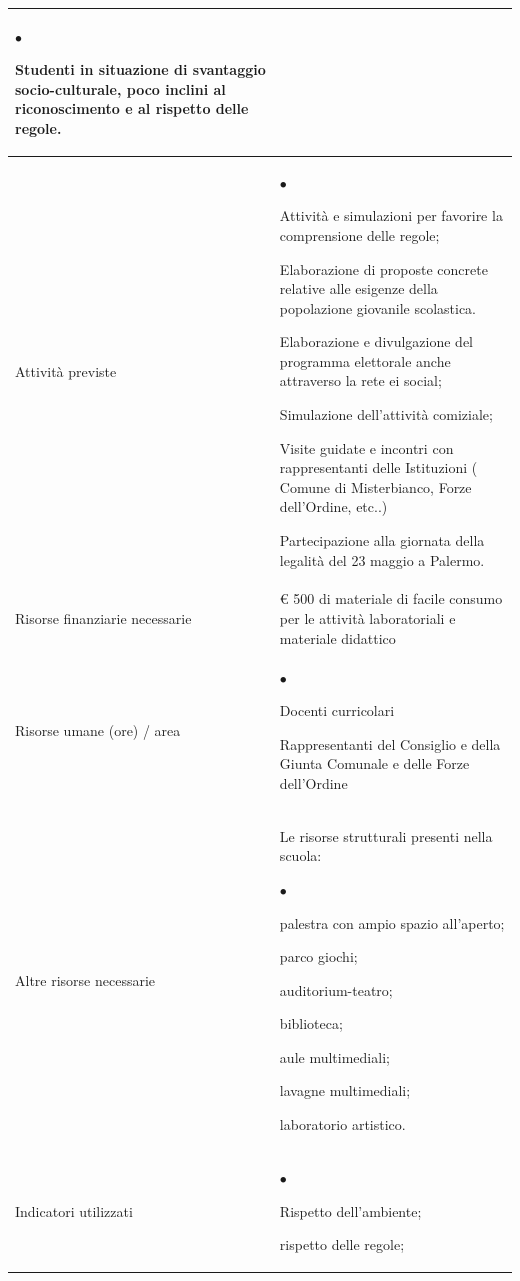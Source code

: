 \documentclass[12pt,a4paper,oneside]{memoir}
\newenvironment{elenco}{\begin{list}{$\bullet$}{%
              \setlength{\leftmargin}{4mm}%
              \setlength{\rightmargin}{1mm}%
               \setlength{\itemindent}{0mm}%
               \setlength{\labelwidth}{2mm}%
               \setlength{\labelsep}{2mm}%
              \setlength{\itemsep}{-\parsep}%
              \setlength{\partopsep}{0pt}%
              \setlength{\topsep}{0pt}%
             \setlength{\parskip}{0pt}%
              }}{\end{list}}
\begin{document}
\begin{footnotesize}
\begin{longtable}{|>{\raggedright}p{2.5cm}|>{\raggedright\arraybackslash}P{10cm}|}
\begin{elenco}
\item Studenti in situazione di svantaggio socio-culturale, poco inclini al riconoscimento e al rispetto delle regole.\end{elenco}\\ \hline
Attività previste&
\begin{elenco}
\item Attività e simulazioni per favorire la comprensione delle regole; 
\item Elaborazione di proposte concrete relative alle esigenze della popolazione giovanile scolastica.
\item Elaborazione e divulgazione del programma elettorale anche attraverso la rete ei social;
\item Simulazione dell'attività comiziale;
\item Visite guidate e incontri con rappresentanti delle Istituzioni ( Comune di Misterbianco, Forze dell'Ordine, etc..)
\item Partecipazione alla giornata della legalità del 23 maggio a Palermo.
\end{elenco}\\[-4mm] \hline
Risorse finanziarie necessarie&€ 500 di materiale di facile consumo per le attività laboratoriali e materiale didattico \\ \hline
Risorse umane (ore) / area&
\begin{elenco}
\item Docenti curricolari
\item Rappresentanti del Consiglio e della Giunta Comunale e delle Forze dell'Ordine
\end{elenco}\\[-4mm] \hline
Altre risorse necessarie&Le risorse strutturali presenti nella scuola:\begin{elenco}
\item palestra con ampio spazio all'aperto;
\item parco giochi;
\item auditorium-teatro;
\item biblioteca;
\item aule multimediali;
\item lavagne multimediali;
\item laboratorio artistico.\end{elenco} \\[-4mm] \hline
Indicatori utilizzati&
\begin{elenco}
\item Rispetto dell'ambiente;
\item rispetto delle regole;

\end{elenco}
\end{longtable}
\end{footnotesize}
\end{document}
